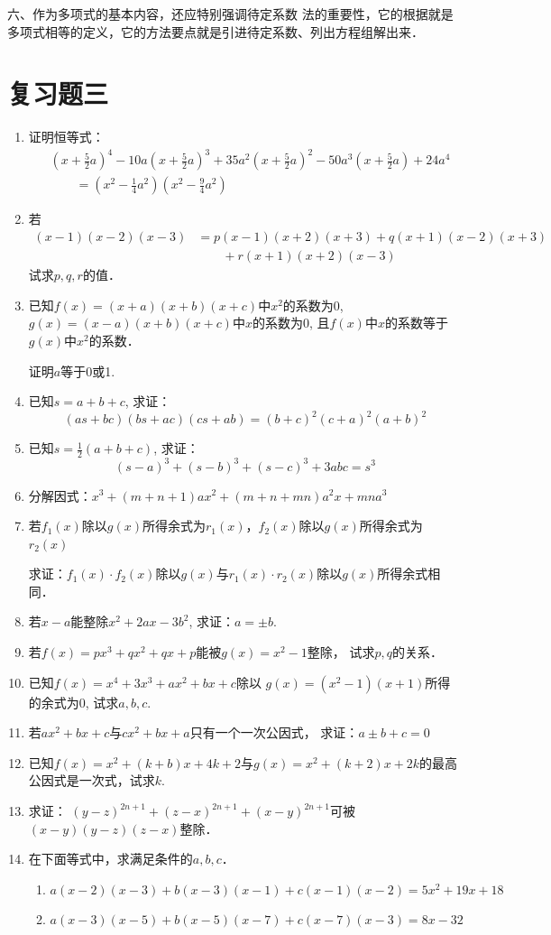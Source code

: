 六、作为多项式的基本内容，还应特别强调待定系数
法的重要性，它的根据就是多项式相等的定义，它的方法要点就是引进待定系数、列出方程组解出来．



\section*{复习题三}
\begin{enumerate}
\item 证明恒等式：
\[\begin{split}
   & \left(x+\frac{5}{2}a\right)^4-10a\left(x+\frac{5}{2}a\right)^3+35a^2\left(x+\frac{5}{2}a\right)^2-50a^3\left(x+\frac{5}{2}a\right)+24a^4\\
&\qquad = \left(x^2-\frac{1}{4}a^2\right)\left(x^2-\frac{9}{4}a^2\right)
\end{split}\]
\item 若
\[\begin{split}
    (x-1)(x-2)(x-3)&=p(x-1) (x+2)(x+3)+q(x+1)(x-2)(x+3)\\
    &\qquad  +r (x+1) (x+2)(x-3)
\end{split}\]
试求$p,q,r$的值．
\item 已知$f(x)=(x+a)(x+b)(x+c)$中$x^2$的系数为0, 
$g(x)=(x-a)(x+b)(x+c)$中$x$的系数为0, 且$f(x)$中$x$的系数等于$g(x)$中$x^2$的系数．

证明$a$等于0或1.
\item 已知$s=a+b+c$, 求证：
\[(as+bc) (bs+ac)(cs+ab)=(b+c)^2(c+a)^2(a+b)^2\]

\item 已知$s=\frac{1}{2}(a+b+c)$, 求证：
\[(s-a)^3+ (s-b)^3+ (s-c)^3+3abc=s^3\]
\item 分解因式：$x^3+ (m+n+1) ax^2+ (m+n+mn) a^2x+mna^3$
\item 若$f_1(x)$除以$g(x)$所得余式为$r_1(x)$，$f_2(x)$除以$g(x)$所得余式为$r_2(x)$

求证：$f_1(x)\cdot f_2(x)$除以$g(x)$与$r_1(x)\cdot r_2(x)$除以$g(x)$所得余式相同．

\item  若$x-a$能整除$x^2+2ax-3b^2$, 求证：$a=\pm b$.

\item  若$f(x)=px^3+qx^2+qx+p$能被$g(x)=x^2-1$整除，
试求$p,q$的关系．
\item  已知$f(x)=x^4+3x^3+ax^2+bx+c$除以
$g(x)=(x^2-1)(x+1)$所得的余式为0, 试求$a,b,c$.
\item  若$ax^2+bx+c$与$cx^2+bx+a$只有一个一次公因式，
求证：$a\pm b+c=0$
\item 已知$f(x)=x^2+(k+b)x+4k+2$与$g(x)=x^2+(k+2)x+2k$的最高公因式是一次式，试求$k$.
\item  求证：
$(y-z)^{2n+1}+(z-x)^{2n+1}+(x-y)^{2n+1}$可被$(x-y)(y-z)(z-x)$整除．
\item  在下面等式中，求满足条件的$a,b,c$．
\begin{enumerate}
    \item $a (x-2) (x-3) +b (x-3) (x-1)+c (x-1) (x-2)=5x^2+19x+18$
    \item $a (x-3) (x-5)+b(x-5)(x-7)+c (x-7) (x-3)=8x-32$
\end{enumerate}


\end{enumerate}
